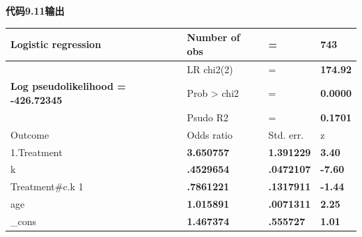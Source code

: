 \documentclass[
  chinese-hans,
  letterpaper,
  DIV=11,
  numbers=noendperiod]{scrreprt}
\newcounter{none} %
\begin{document}
\begin{tcolorbox}[enhanced jigsaw, arc=.35mm, bottomrule=.15mm, breakable, colback=white, colframe=quarto-callout-note-color-frame, left=2mm, leftrule=.75mm, opacityback=0, rightrule=.15mm, toprule=.15mm]

\vspace{-3mm}\textbf{代码9.11输出}\vspace{3mm}

{\def\LTcaptype{none} %
\begin{longtable}[]{@{}
  >{\centering\arraybackslash}p{}
  >{\raggedright\arraybackslash}p{}
  >{\centering\arraybackslash}p{}
  >{\centering\arraybackslash}p{}@{}}
\toprule\noalign{}
\begin{minipage}[b]{\linewidth}\centering
Logistic regression
\end{minipage} & \begin{minipage}[b]{\linewidth}\raggedright
Number of obs
\end{minipage} & \begin{minipage}[b]{\linewidth}\centering
=
\end{minipage} & \begin{minipage}[b]{\linewidth}\centering
\textbf{743}
\end{minipage} \\
\midrule\noalign{}
\endhead
\bottomrule\noalign{}
\endlastfoot
& LR chi2(2) & = & \textbf{174.92} \\
\textbf{Log pseudolikelihood = -426.72345} & Prob \textgreater{} chi2 &
= & \textbf{0.0000} \\
& Psudo R2 & = & \textbf{0.1701} \\
Outcome & Odds ratio & Std. err. & z \\
1.Treatment & \textbf{3.650757} & \textbf{1.391229} & \textbf{3.40} \\
k & \textbf{.4529654} & \textbf{.0472107} & \textbf{-7.60} \\
Treatment\#c.k 1 & \textbf{.7861221} & \textbf{.1317911} &
\textbf{-1.44} \\
age & \textbf{1.015891} & \textbf{.0071311} & \textbf{2.25} \\
\_cons & \textbf{1.467374} & \textbf{.555727} & \textbf{1.01} \\
\end{longtable}
}

\end{tcolorbox}
\end{document}
